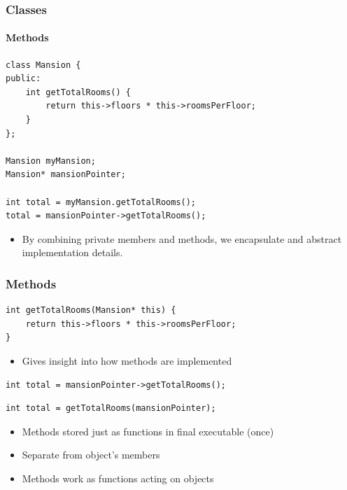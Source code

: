 \documentclass[table]{beamer}
\newcommand{\declarelesson}{\textbf{\color{themegreen}{Lesson:}} }
\newcommand{\declarebts}{\textbf{\color{themeorange}{Behind the Scenes:}} }
\begin{document}
\begin{frame}[fragile]
    \frametitle{\declarelesson Classes }
    \framesubtitle{Methods}
    \begin{lstlisting}[title=Using a method]
class Mansion {
public:
    int getTotalRooms() {
        return this->floors * this->roomsPerFloor;
    }
};

Mansion myMansion;
Mansion* mansionPointer;

int total = myMansion.getTotalRooms();
total = mansionPointer->getTotalRooms();
    \end{lstlisting}
    \begin{itemize}
        \item By combining private members and methods, we encapsulate and
            abstract implementation details.
    \end{itemize}
\end{frame}

\begin{frame}[fragile]
    \frametitle{\declarebts Methods }
    \begin{lstlisting}[title=\texttt{this} pointer idiom in C]
int getTotalRooms(Mansion* this) {
    return this->floors * this->roomsPerFloor;
}
    \end{lstlisting}
    \begin{itemize}
        \item Gives insight into how methods are implemented
    \end{itemize}
    \begin{lstlisting}[title=Calling an object's method]
int total = mansionPointer->getTotalRooms();
    \end{lstlisting}
    \begin{lstlisting}[title=Behind the scenes]
int total = getTotalRooms(mansionPointer);
    \end{lstlisting}
    \begin{itemize}
        \item Methods stored just as functions in final executable (once)
        \item Separate from object's members
        \item Methods work as functions acting on objects
    \end{itemize}
\end{frame}


\end{document}
